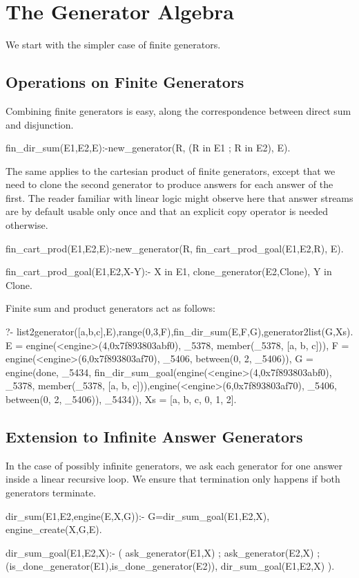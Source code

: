 \documentclass{new_tlp}
\begin{document}
\section{The Generator Algebra}
We start with the simpler case of finite generators.
 
\subsection{Operations on Finite  Generators}

Combining finite generators is easy, along the correspondence
between direct sum and disjunction.
\begin{code}
fin_dir_sum(E1,E2,E):-new_generator(R, (R in E1 ; R in E2), E).
\end{code}
The same applies to the cartesian product of finite generators, except that
we need to clone the second generator to produce answers for each answer of the first.
The reader familiar with linear logic might observe here that answer streams are
by default usable only once and that an explicit copy operator is needed otherwise.

\begin{code}
fin_cart_prod(E1,E2,E):-new_generator(R, fin_cart_prod_goal(E1,E2,R), E).

fin_cart_prod_goal(E1,E2,X-Y):-
  X in E1,
  clone_generator(E2,Clone),
  Y in Clone.  
\end{code}

\BX 
Finite sum and product generators act as follows:
\begin{codex}
?- list2generator([a,b,c],E),range(0,3,F),fin_dir_sum(E,F,G),generator2list(G,Xs).
E = engine(<engine>(4,0x7f893803abf0), _5378, member(_5378, [a, b, c])),
F = engine(<engine>(6,0x7f893803af70), _5406, between(0, 2, _5406)),
G = engine(done, _5434, fin_dir_sum_goal(engine(<engine>(4,0x7f893803abf0), _5378,
member(_5378, [a, b, c])),engine(<engine>(6,0x7f893803af70), _5406, 
between(0, 2, _5406)), _5434)),
Xs = [a, b, c, 0, 1, 2].
\end{codex}
\EX



\subsection{Extension to Infinite Answer Generators}

In the case of possibly infinite generators, we  ask each generator for one answer inside a linear recursive loop. We ensure that termination only happens if both generators terminate.
\begin{code}
dir_sum(E1,E2,engine(E,X,G)):-
  G=dir_sum_goal(E1,E2,X),
  engine_create(X,G,E).
  
dir_sum_goal(E1,E2,X):-
  ( ask_generator(E1,X)
  ; ask_generator(E2,X)
  ; \+ (is_done_generator(E1),is_done_generator(E2)),
    dir_sum_goal(E1,E2,X)
  ).  
\end{code}
\end{document}
